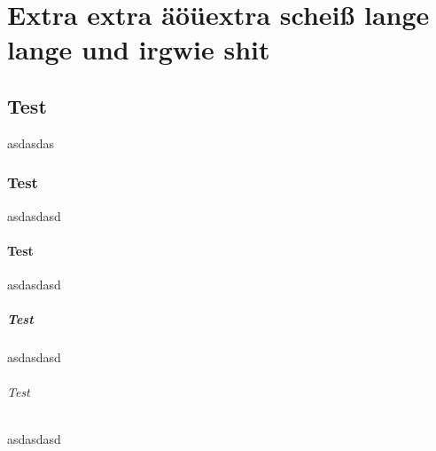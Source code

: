 \documentclass[]{asset/hsrmreport}
\begin{document}
    
    
\part{Extra extra äöüextra scheiß lange lange und irgwie shit}

\chapter{Test}asdasdas

\section{Test}asdasdasd
\subsection{Test}asdasdasd
\subsubsection{Test}asdasdasd
\paragraph{Test}asdasdasd
\end{document}
